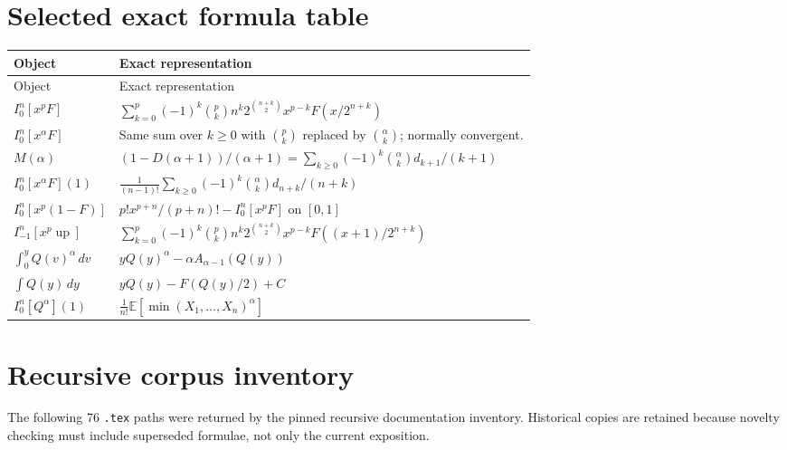 \documentclass[11pt,oneside]{article}
\theoremstyle{definition}
\theoremstyle{remark}
\newcommand{\Up}{\operatorname{up}}
\newcommand{\E}{\mathbb E}
\newcommand{\rise}[2]{#1^{\overline{#2}}}
\newcommand{\1}{\mathbf 1}
\begin{document}
\section{Selected exact formula table}
\label{p3:app:formula-table}

\begin{longtable}{@{}p{}p{}@{}}
\toprule
Object & Exact representation\\
\midrule
\endfirsthead
\toprule
Object & Exact representation\\
\midrule
\endhead
$\displaystyle I_0^n[x^pF]$
& $\displaystyle\sum_{k=0}^p(-1)^k\binom pk\rise nk
2^{\binom{n+k}{2}}x^{p-k}F(x/2^{n+k})$\\[0.7em]
$\displaystyle I_0^n[x^\alpha F]$
& Same sum over $k\ge0$ with $\binom pk$ replaced by $\binom\alpha k$; normally convergent.\\[0.7em]
$\displaystyle M(\alpha)$
& $\displaystyle(1-D(\alpha+1))/(\alpha+1)
=\sum_{k\ge0}(-1)^k\binom\alpha k d_{k+1}/(k+1)$\\[0.7em]
$\displaystyle I_0^n[x^\alpha F](1)$
& $\displaystyle\frac1{(n-1)!}\sum_{k\ge0}(-1)^k\binom\alpha k d_{n+k}/(n+k)$\\[0.7em]
$\displaystyle I_0^n[x^p(1-F)]$
& $\displaystyle p!x^{p+n}/(p+n)!-I_0^n[x^pF]$ on $[0,1]$\\[0.7em]
$\displaystyle I_{-1}^n[x^p\Up]$
& $\displaystyle\sum_{k=0}^p(-1)^k\binom pk\rise nk2^{\binom{n+k}{2}}
 x^{p-k}F((x+1)/2^{n+k})$\\[0.7em]
$\displaystyle\int_0^yQ(v)^\alpha\,dv$
& $\displaystyle yQ(y)^\alpha-\alpha A_{\alpha-1}(Q(y))$\\[0.7em]
$\displaystyle\int Q(y)\,dy$
& $\displaystyle yQ(y)-F(Q(y)/2)+C$\\[0.7em]
$\displaystyle I_0^n[Q^\alpha](1)$
& $\displaystyle\frac1{n!}\E[\min(X_1,\ldots,X_n)^\alpha]$\\[0.7em]
\bottomrule
\end{longtable}

\section{Recursive corpus inventory}
\label{p3:app:inventory}

The following 76 \texttt{.tex} paths were returned by the pinned recursive documentation
inventory.  Historical copies are retained because novelty checking must include superseded
formulae, not only the current exposition.
\end{document}
